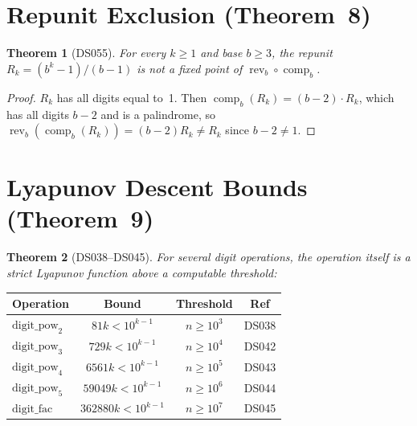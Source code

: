 \documentclass[11pt,a4paper]{amsart}
\theoremstyle{plain}
\newtheorem{theorem}{Theorem}
\theoremstyle{definition}
\theoremstyle{remark}
\DeclareMathOperator{\rev}{rev}
\DeclareMathOperator{\comp}{comp}
\begin{document}
\section{Repunit Exclusion (Theorem~8)}\label{sec:repunit}

\begin{theorem}[DS055]\label{thm:repunit}
For every $k \geq 1$ and base $b \geq 3$, the repunit
$R_k = (b^k - 1)/(b{-}1)$ is not a fixed point of $\rev_b \circ \comp_b$.
\end{theorem}

\begin{proof}
$R_k$ has all digits equal to~1. Then $\comp_b(R_k) = (b{-}2) \cdot R_k$,
which has all digits $b{-}2$ and is a palindrome, so
$\rev_b(\comp_b(R_k)) = (b{-}2) R_k \neq R_k$ since $b{-}2 \neq 1$.
\end{proof}

\section{Lyapunov Descent Bounds (Theorem~9)}\label{sec:lyapunov-descent}

\begin{theorem}[DS038--DS045]\label{thm:lyapunov-descent}
For several digit operations, the operation itself is a strict Lyapunov
function above a computable threshold:
\end{theorem}

\begin{center}
\begin{tabular}{@{}lccc@{}}
\toprule
Operation & Bound & Threshold & Ref \\
\midrule
$\text{digit\_pow}_2$ & $81k < 10^{k-1}$ & $n \geq 10^3$ & DS038 \\
$\text{digit\_pow}_3$ & $729k < 10^{k-1}$ & $n \geq 10^4$ & DS042 \\
$\text{digit\_pow}_4$ & $6561k < 10^{k-1}$ & $n \geq 10^5$ & DS043 \\
$\text{digit\_pow}_5$ & $59049k < 10^{k-1}$ & $n \geq 10^6$ & DS044 \\
$\text{digit\_fac}$   & $362880k < 10^{k-1}$ & $n \geq 10^7$ & DS045 \\
\bottomrule
\end{tabular}
\end{center}
\end{document}
